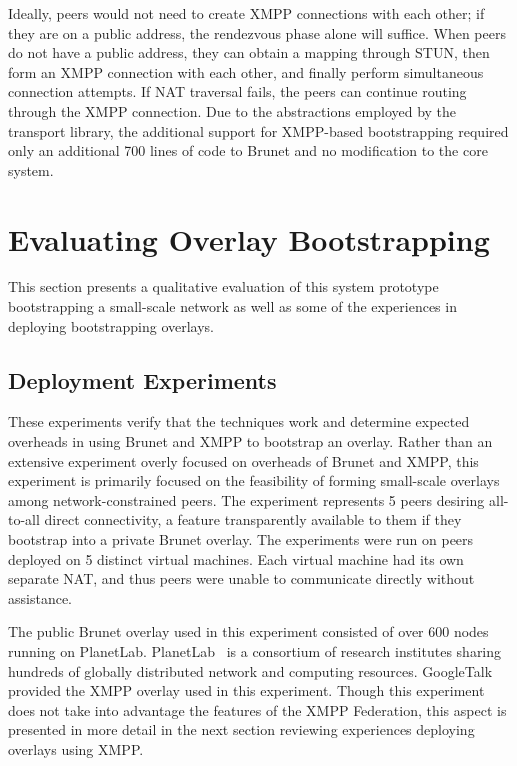 Ideally, peers would not need to create XMPP connections with each other; if
they are on a public address, the rendezvous phase alone will suffice.  When
peers do not have a public address, they can obtain a mapping through STUN,
then form an XMPP connection with each other, and finally perform simultaneous
connection attempts.  If NAT traversal fails, the peers can continue routing
through the XMPP connection.  Due to the abstractions employed by the transport
library, the additional support for XMPP-based bootstrapping required only an
additional 700 lines of code to Brunet and no modification to the core system.

\section{Evaluating Overlay Bootstrapping}
\label{bs:evaluations}

This section presents a qualitative evaluation of this system prototype
bootstrapping a small-scale network as well as some of the experiences in
deploying bootstrapping overlays.

\subsection{Deployment Experiments}

These experiments verify that the techniques work and determine expected
overheads in using Brunet and XMPP to bootstrap an overlay.  Rather than an
extensive experiment overly focused on overheads of Brunet and XMPP, this
experiment is primarily focused on the feasibility of forming small-scale
overlays among network-constrained peers.  The experiment represents 5 peers
desiring all-to-all direct connectivity, a feature transparently available to
them if they bootstrap into a private Brunet overlay. The experiments were run
on peers deployed on 5 distinct virtual machines.  Each virtual machine had its
own separate NAT, and thus peers were unable to communicate directly without
assistance.

The public Brunet overlay used in this experiment consisted of over 600 nodes
running on PlanetLab.  PlanetLab~\cite{planetlab} is a consortium of research
institutes sharing hundreds of globally distributed network and computing
resources.  GoogleTalk provided the XMPP overlay used in this experiment.
Though this experiment does not take into advantage the features of the XMPP
Federation, this aspect is presented in more detail in the next section
reviewing experiences deploying overlays using XMPP.

